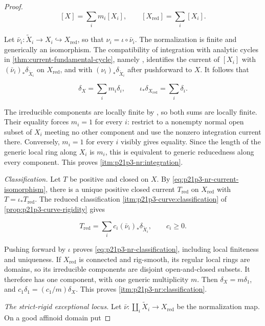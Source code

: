 \begin{proof}
\[
                 [X]=\sum_i m_i[X_i],
                 \qquad
                 [X_{\mathrm{red}}]=\sum_i[X_i].
\]

Let
\(\bar\nu_i:\widetilde X_i\to X_i\hookrightarrow X_{\mathrm{red}}\),
so that \(\nu_i=\iota\circ\bar\nu_i\).  The normalization is finite and
generically an isomorphism.  The compatibility of integration with
analytic cycles in \cref{thm:current-fundamental-cycle}, namely
\cite[Proposition~16.6.3]{CLD25}, identifies the current of \([X_i]\) with
\((\bar\nu_i)_*\delta_{\widetilde X_i}\) on \(X_{\mathrm{red}}\), and
with \((\nu_i)_*\delta_{\widetilde X_i}\) after pushforward to \(X\).
It follows that

\[
 \delta_X=\sum_i m_i\delta_i,
 \qquad
 \iota_*\delta_{X_{\mathrm{red}}}=\sum_i\delta_i.
\]

The irreducible components are locally finite by
\cite[\S11.2.5]{CLD25}, so both sums are locally finite.  Their equality
forces \(m_i=1\) for every \(i\): restrict to a nonempty normal open subset
of \(X_i\) meeting no other component and use the nonzero integration
current there.  Conversely, \(m_i=1\) for every \(i\) visibly gives
equality.  Since the length of the generic local ring along \(X_i\) is
\(m_i\), this is equivalent to generic reducedness along every component.
This proves \cref{itm:p21p3-nr:integration}.

\smallskip
\emph{Classification.}
Let \(T\) be positive and closed on \(X\).  By
\eqref{eq:p21p3-nr-current-isomorphism}, there is a unique positive
closed current \(T_{\mathrm{red}}\) on \(X_{\mathrm{red}}\) with
\(T=\iota_*T_{\mathrm{red}}\).  The reduced classification
\cref{itm:p21p3-curve:classification} of
\cref{prop:p21p3-curve-rigidity} gives

\[
                  T_{\mathrm{red}}=\sum_i c_i
                    (\bar\nu_i)_*\delta_{\widetilde X_i},
                  \qquad c_i\geq0.
\]

Pushing forward by \(\iota\) proves
\eqref{eq:p21p3-nr-classification}, including local finiteness and
uniqueness.  If \(X_{\mathrm{red}}\) is connected and rig-smooth, its
regular local rings are domains, so its irreducible components are
disjoint open-and-closed subsets.  It therefore has one component, with
one generic multiplicity \(m\).  Then
\(\delta_X=m\delta_1\), and
\(c_1\delta_1=(c_1/m)\delta_X\).  This proves
\cref{itm:p21p3-nr:classification}.

\smallskip
\emph{The strict-rigid exceptional locus.}
Let
\(\bar\nu:\coprod_i\widetilde X_i\to X_{\mathrm{red}}\) be the
normalization map.  On a good affinoid domain put


\end{proof}
